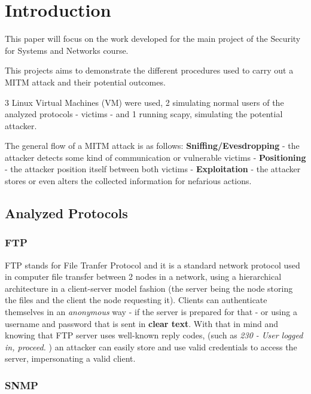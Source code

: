 \section{Introduction}
\label{sec:Intro}
This paper will focus on the work developed for the main project of the 
Security for Systems and Networks course.

This projects aims to demonstrate the different procedures used to carry out a 
MITM attack and their potential outcomes.

3 Linux Virtual Machines (VM) were used, 2 simulating normal users of the 
analyzed protocols - victims - and 1 running scapy, simulating the potential 
attacker.

The general flow of a MITM attack is as follows: \textbf{Sniffing/Evesdropping}
- the attacker detects some kind of communication or vulnerable victims - 
\textbf{Positioning} - the attacker position itself between both victims -
\textbf{Exploitation} - the attacker stores or even alters the collected 
information for nefarious actions.

\subsection{Analyzed Protocols}

\subsubsection{FTP}

FTP stands for File Tranfer Protocol and it is a standard network protocol used in computer file transfer between 2 nodes in a network, using a hierarchical architecture in a client-server model fashion (the server being the node storing the files and the client the node requesting it). 
Clients can authenticate themselves in an \textit{anonymous} way - if the server is prepared for that - or using a username and password that is sent in \textbf{clear text}. 
With that in mind and knowing that FTP server uses well-known reply codes, (such as \textit{ 230 - User logged in, proceed.} ) an attacker can easily store and use valid credentials to access the server, impersonating a valid client.  

\subsubsection{SNMP}

